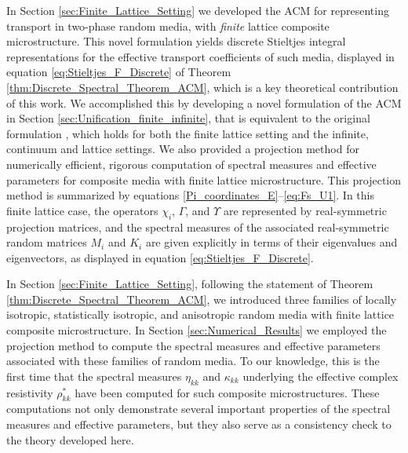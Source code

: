 \documentclass{cmslatex}
\begin{document}
In Section \ref{sec:Finite_Lattice_Setting} we developed the ACM for
representing transport in two-phase random media, with \emph{finite}
lattice composite microstructure. This novel formulation yields
discrete Stieltjes integral representations for the effective
transport coefficients of such media, displayed in equation
\eqref{eq:Stieltjes_F_Discrete} of Theorem
\ref{thm:Discrete_Spectral_Theorem_ACM}, which is a key theoretical
contribution of this work. We accomplished this by developing a novel
formulation of the ACM in Section
\ref{sec:Unification_finite_infinite}, that is equivalent to the
original formulation \cite{Golden:CMP-473}, which holds for both the
finite lattice setting and the infinite, continuum and lattice
settings. We also provided a projection method for numerically
efficient, rigorous computation of spectral measures and effective
parameters for composite media with finite lattice
microstructure. This projection method is summarized by equations 
\eqref{Pi_coordinates_E}--\eqref{eq:Fs_U1}. In this finite lattice
case, the operators $\chi_i$, $\Gamma$, and $\Upsilon$ are represented by
real-symmetric projection matrices, and the spectral measures of the
associated real-symmetric random matrices $M_i$ and $K_i$ are given
explicitly in terms of their eigenvalues and eigenvectors, as
displayed in equation \eqref{eq:Stieltjes_F_Discrete}.  



In Section \ref{sec:Finite_Lattice_Setting}, following the statement
of Theorem \ref{thm:Discrete_Spectral_Theorem_ACM}, we introduced three 
families of locally isotropic, statistically isotropic, and
anisotropic random media with finite lattice composite microstructure. In Section
\ref{sec:Numerical_Results} we employed the projection method to
compute the spectral measures and effective parameters associated with
these families of random media. To our knowledge, this is the first
time that the spectral measures $\eta_{kk}$ and $\kappa_{kk}$ underlying the
effective complex resistivity $\rho^*_{kk}$ have been computed for such
composite microstructures. These computations not only demonstrate
several important properties of the spectral measures and effective
parameters, but they also serve as a consistency check to the theory
developed here. 
\end{document}

